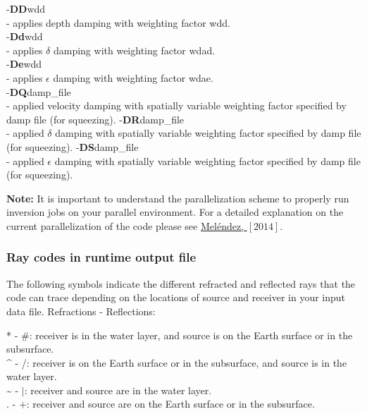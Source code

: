\documentclass[twoside,final,onecolumn]{article}
\newcommand{\forceindent}{\leavevmode{\parindent=1em\indent}}
\begin{document}
\forceindent -\textbf{DD}wdd \\
\forceindent\forceindent - applies depth damping with weighting factor wdd.\\[6pt]
\forceindent -\textbf{Dd}wdd \\
\forceindent\forceindent - applies $\delta$ damping with weighting factor wdad.\\[6pt]
\forceindent -\textbf{De}wdd \\
\forceindent\forceindent - applies $\epsilon$ damping with weighting factor wdae.\\[6pt]
\forceindent -\textbf{DQ}damp\_file \\
\forceindent\forceindent - applied velocity damping with spatially variable weighting factor specified by damp file (for squeezing).
\forceindent -\textbf{DR}damp\_file \\
\forceindent\forceindent - applied $\delta$ damping with spatially variable weighting factor specified by damp file (for squeezing).
\forceindent -\textbf{DS}damp\_file \\
\forceindent\forceindent - applied $\epsilon$ damping with spatially variable weighting factor specified by damp file (for squeezing).

\textbf{Note:} It is important to understand the parallelization scheme to properly run inversion jobs on your parallel environment. 
For a detailed explanation on the current parallelization of the code please see \href{http://www.tdx.cat/handle/10803/289786}{Mel\'{e}ndez, $[2014]$}. 

\subsubsection{Ray codes in runtime output file}

The following symbols indicate the different refracted and reflected rays that the code can trace depending on the locations of source and receiver in your input data file.
\newpage
Refractions - Reflections:

* - \#: receiver is in the water layer, and source is on the Earth surface or in the subsurface.\\
\^{} - /: receiver is on the Earth surface or in the subsurface, and source is in the water layer.\\
\~{} - $|$: receiver and source are in the water layer.\\
. - +: receiver and source are on the Earth surface or in the subsurface.\\
\end{document}
